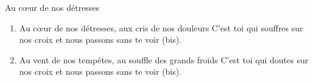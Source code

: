 Au cœur de nos détresses
\begin{enumerate}
\item
Au cœur de nos détresses, aux cris de nos douleurs
C’est toi qui souffres sur nos croix et nous passons sans te voir (bis).
\item
Au vent de nos tempêtes, au souffle des grands froids
C’est toi qui doutes sur nos croix et nous passons sans te voir (bis).
\end{enumerate}
